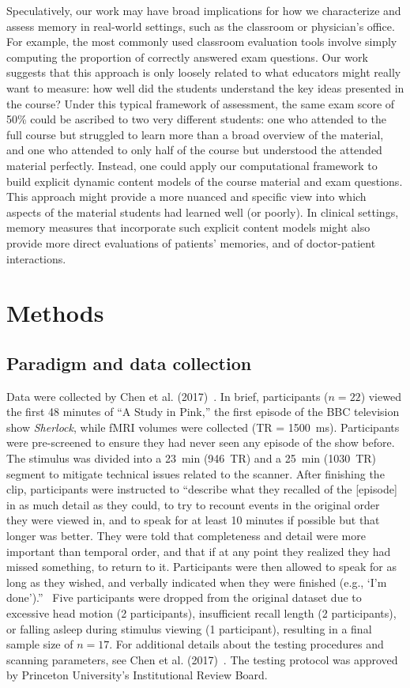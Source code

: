 \documentclass[10pt]{article}
\begin{document}
Speculatively, our work may have broad implications for how we characterize and assess memory in real-world settings, such as the classroom or physician's office.  For example, the most commonly used classroom evaluation tools involve simply computing the proportion of correctly answered exam questions.  Our work suggests that this approach is only loosely related to what educators might really want to measure: how well did the students understand the key ideas presented in the course?  Under this typical framework of assessment, the same exam score of 50\% could be ascribed to two very different students: one who attended to the full course but struggled to learn more than a broad overview of the material, and one who attended to only half of the course but understood the attended material perfectly.  Instead, one could apply our computational framework to build explicit dynamic content models of the course material and exam questions.  This approach might provide a more nuanced and specific view into which aspects of the material students had learned well (or poorly).  In clinical settings, memory measures that incorporate such explicit content models might also provide more direct evaluations of patients' memories, and of doctor-patient interactions.


\section*{Methods}
\label{sec:methods}

\subsection*{Paradigm and data collection}
Data were collected by Chen et al. (2017)~\citep{ChenEtal17}.  In brief, participants ($n=22$) viewed the first 48 minutes of ``A Study in Pink,'' the first episode of the BBC television show \textit{Sherlock}, while fMRI volumes were collected (TR = 1500~ms).  Participants were pre-screened to ensure they had never seen any episode of the show before.  The stimulus was divided into a 23~min (946~TR) and a 25~min (1030~TR) segment to mitigate technical issues related to the scanner.  After finishing the clip, participants were instructed to ``describe what they recalled of the [episode] in as much detail as they could, to try to recount events in the original order they were viewed in, and to speak for at least 10 minutes if possible but that longer was better. They were told that completeness and detail were more important than temporal order, and that if at any point they realized they had missed something, to return to it. Participants were then allowed to speak for as long as they wished, and verbally indicated when they were finished (e.g., `I’m done').''~\citep{ChenEtal17}  Five participants were dropped from the original dataset due to excessive head motion (2 participants), insufficient recall length (2 participants), or falling asleep during stimulus viewing (1 participant), resulting in a final sample size of $n=17$.  For additional details about the testing procedures and scanning parameters, see Chen et al. (2017)~\cite{ChenEtal17}.  The testing protocol was approved by Princeton University's Institutional Review Board.
\end{document}
